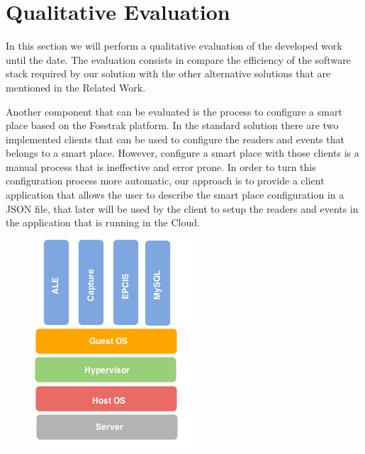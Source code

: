 \section{Qualitative Evaluation}
\label{sec:qualitative_evaluation}
In this section we will perform a qualitative evaluation of the developed work until the date. The
evaluation consists in compare the efficiency of the software stack required by our solution with
the other alternative solutions that are mentioned in the Related Work.

Another component that can be evaluated is the process to configure a smart place based on the
Fosstrak platform. In the standard solution there are two implemented clients that can be used to
configure the readers and events that belongs to a smart place. However, configure a smart place
with those clients is a manual process that is ineffective and error prone. In order to turn this
configuration process more automatic, our approach is to provide a client application that allows
the user to describe the smart place configuration in a JSON file, that later will be used by the
client to setup the readers and events in the application that is running in the Cloud.

\begin{figure}
  \centering
  \includegraphics[width=.3\textwidth]{images/vm-stack}
\end{figure}
